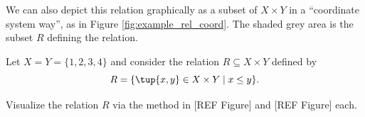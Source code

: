 \begin{center}
\end{center}

We can also depict this relation graphically as a subset of $X \times Y$ in a ``coordinate system way'', as in Figure \ref{fig:example_rel_coord}. The shaded grey area is the subset $R$ defining the relation. 

\begin{figure}[h!]
\begin{center}
\end{center}
\end{figure}

\begin{exercise}
Let $X = Y = \{1, 2, 3, 4 \}$ and consider the relation $R \subseteq X \times Y$ defined by 
\begin{equation}
R = \{ \tup{x,y} \in X \times Y \mid x \leq y \}. 
\end{equation}

Visualize the relation $R$ via the method in [REF Figure] and [REF Figure] each. 
\end{exercise}

